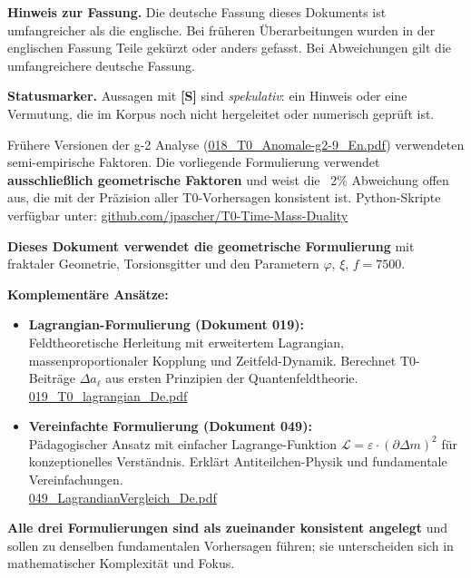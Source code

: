 	\medskip\noindent\textbf{Hinweis zur Fassung.} Die deutsche Fassung dieses Dokuments ist umfangreicher als die englische. Bei früheren Überarbeitungen wurden in der englischen Fassung Teile gekürzt oder anders gefasst. Bei Abweichungen gilt die umfangreichere deutsche Fassung.


	\medskip\noindent\textbf{Statusmarker.} Aussagen mit \textbf{[S]} sind \emph{spekulativ}: ein Hinweis oder eine Vermutung, die im Korpus noch nicht hergeleitet oder numerisch geprüft ist.


	
	\begin{tcolorbox}[colback=yellow!10!white, colframe=orange!75!black, title=Hinweis zu älteren Dokumenten]
		Frühere Versionen der g-2 Analyse (\href{https://github.com/jpascher/T0-Time-Mass-Duality/blob/main/2/pdf/018_T0_Anomale-g2-9_En.pdf}{018\_T0\_Anomale-g2-9\_En.pdf}) verwendeten semi-empirische Faktoren. Die vorliegende Formulierung verwendet \textbf{ausschließlich geometrische Faktoren} und weist die ~2\% Abweichung offen aus, die mit der Präzision aller T0-Vorhersagen konsistent ist. Python-Skripte verfügbar unter: \href{https://github.com/jpascher/T0-Time-Mass-Duality/blob/main/2/python/}{github.com/jpascher/T0-Time-Mass-Duality}
	\end{tcolorbox}
	
	\begin{tcolorbox}[colback=blue!10!white, colframe=blue!75!black, title=Alternative Formulierungen der T0-Theorie]
		\textbf{Dieses Dokument verwendet die geometrische Formulierung} mit fraktaler Geometrie, Torsionsgitter und den Parametern $\varphi$, $\xi$, $f = 7500$.
		
		\textbf{Komplementäre Ansätze:}
		\begin{itemize}
			\item \textbf{Lagrangian-Formulierung (Dokument 019):} \\
			Feldtheoretische Herleitung mit erweitertem Lagrangian, massenproportionaler Kopplung und Zeitfeld-Dynamik. Berechnet T0-Beiträge $\Delta a_\ell$ aus ersten Prinzipien der Quantenfeldtheorie. \\
			\rightarrow \href{https://github.com/jpascher/T0-Time-Mass-Duality/blob/main/2/pdf/019_T0_lagrangian_De.pdf}{019\_T0\_lagrangian\_De.pdf}
			
			\item \textbf{Vereinfachte Formulierung (Dokument 049):} \\
			Pädagogischer Ansatz mit einfacher Lagrange-Funktion $\mathcal{L} = \varepsilon \cdot (\partial \Delta m)^2$ für konzeptionelles Verständnis. Erklärt Antiteilchen-Physik und fundamentale Vereinfachungen. \\
			\rightarrow \href{https://github.com/jpascher/T0-Time-Mass-Duality/blob/main/2/pdf/049_LagrandianVergleich_De.pdf}{049\_LagrandianVergleich\_De.pdf}
		\end{itemize}
		
		\textbf{Alle drei Formulierungen sind als zueinander konsistent angelegt} und sollen zu denselben fundamentalen Vorhersagen führen; sie unterscheiden sich in mathematischer Komplexität und Fokus.
	\end{tcolorbox}
	
